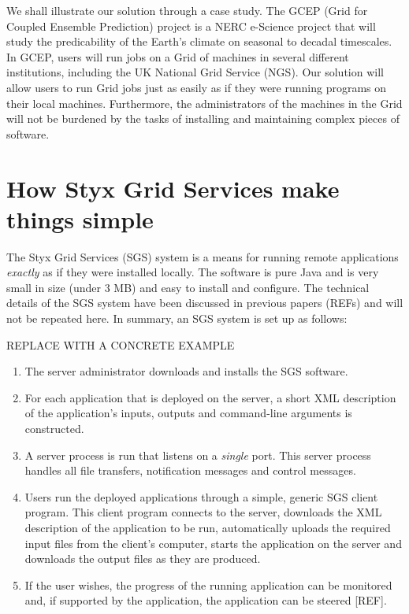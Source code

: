 \documentclass[a4paper]{article}
\begin{document}
\begin{multicols}{2}
We shall illustrate our solution through a case study.  The GCEP (Grid for Coupled Ensemble Prediction) project is a NERC e-Science project that will study the predicability of the Earth's climate on seasonal to decadal timescales.  In GCEP, users will run jobs on a Grid of machines in several different institutions, including the UK National Grid Service (NGS).  Our solution will allow users to run Grid jobs just as easily as if they were running programs on their local machines.  Furthermore, the administrators of the machines in the Grid will not be burdened by the tasks of installing and maintaining complex pieces of software.


\section{How Styx Grid Services make things simple}
The Styx Grid Services (SGS) system is a means for running remote applications {\em exactly\/} as if they were installed locally.  The software is pure Java and is very small in size (under 3 MB) and easy to install and configure.  The technical details of the SGS system have been discussed in previous papers (REFs) and will not be repeated here.  In summary, an SGS system is set up as follows:

REPLACE WITH A CONCRETE EXAMPLE

\begin{enumerate}
\item The server administrator downloads and installs the SGS software.
\item For each application that is deployed on the server, a short XML description of the application's inputs, outputs and command-line arguments is constructed.
\item A server process is run that listens on a {\em single\/} port.  This server process handles all file transfers, notification messages and control messages.
\item Users run the deployed applications through a simple, generic SGS client program.  This client program connects to the server, downloads the XML description of the application to be run, automatically uploads the required input files from the client's computer, starts the application on the server and downloads the output files as they are produced.
\item If the user wishes, the progress of the running application can be monitored and, if supported by the application, the application can be steered [REF].
\end{enumerate}


\end{multicols}
\end{document}
